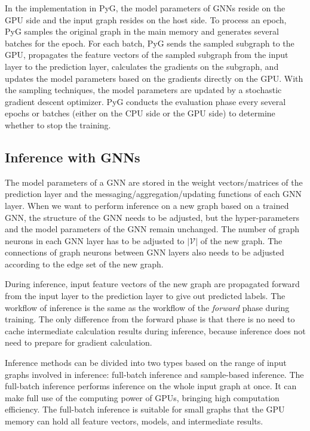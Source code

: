 In the implementation in PyG, the model parameters of GNNs reside on the GPU side and the input graph resides on the host side.
%
To process an epoch, PyG samples the original graph in the main memory and generates several batches for the epoch.
%
For each batch, PyG sends the sampled subgraph to the GPU, propagates the feature vectors of the sampled subgraph from the input layer to the prediction layer, calculates the gradients on the subgraph, and updates the model parameters based on the gradients directly on the GPU.
%
With the sampling techniques, the model parameters are updated by a stochastic gradient descent optimizer.
%
PyG conducts the evaluation phase every several epochs or batches (either on the CPU side or the GPU side) to determine whether to stop the training.


\subsection{Inference with GNNs}

The model parameters of a GNN are stored in the weight vectors/matrices of the prediction layer and the messaging/aggregation/updating functions of each GNN layer.
%
When we want to perform inference on a new graph based on a trained GNN, the structure of the GNN needs to be adjusted, but the hyper-parameters and the model parameters of the GNN remain unchanged.
%
The number of graph neurons in each GNN layer has to be adjusted to $|\mathcal{V}|$ of the new graph.
%
The connections of graph neurons between GNN layers also needs to be adjusted according to the edge set of the new graph.

During inference, input feature vectors of the new graph are propagated forward from the input layer to the prediction layer to give out predicted labels.
%
The workflow of inference is the same as the workflow of the \emph{forward} phase during training.
%
The only difference from the forward phase is that there is no need to cache intermediate calculation results during inference, because inference does not need to prepare for gradient calculation.

Inference methods can be divided into two types based on the range of input graphs involved in inference: full-batch inference and sample-based inference.
%
The full-batch inference performs inference on the whole input graph at once.
%
It can make full use of the computing power of GPUs, bringing high computation efficiency.
%
The full-batch inference is suitable for small graphs that the GPU memory can hold all feature vectors, models, and intermediate results.

